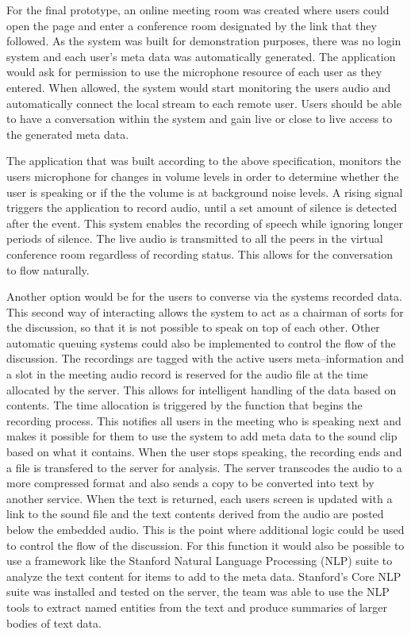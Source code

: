 \documentclass[english,12pt,a4paper,pdftex]{article}
\begin{document}
For the final prototype, an online meeting room was created where users could open the page and enter a conference room designated by the link that they followed. As the system was built for demonstration purposes, there was no login system and each user's meta data was automatically generated. The application would ask for permission to use the microphone resource of each user as they entered. When allowed, the system would start monitoring the users audio and automatically connect the local stream to each remote user. Users should be able to have a conversation within the system and gain live or close to live access to the generated meta data.

The application that was built according to the above specification, monitors the users microphone for changes in volume levels in order to determine whether the user is speaking or if the the volume is at background noise levels. A rising signal triggers the application to record audio, until a set amount of silence is detected after the event. This system enables the recording of speech while ignoring longer periods of silence. The live audio is transmitted to all the peers in the virtual conference room regardless of recording status. This allows for the conversation to flow naturally. 

Another option would be for the users to converse via the systems recorded data. This second way of interacting allows the system to act as a chairman of sorts for the discussion, so that it is not possible to speak on top of each other. Other automatic queuing systems could also be implemented to control the flow of the discussion. The recordings are tagged with the active users meta--information and a slot in the meeting audio record is reserved for the audio file at the time allocated by the server. This allows for intelligent handling of the data based on contents. The time allocation is triggered by the function that begins the recording process. This notifies all users in the meeting who is speaking next and makes it possible for them to use the system to add meta data to the sound clip based on what it contains. When the user stops speaking, the recording ends and a file is transfered to the server for analysis. The server transcodes the audio to a more compressed format and also sends a copy to be converted into text by another service. When the text is returned, each users screen is updated with a link to the sound file and the text contents derived from the audio are posted below the embedded audio. This is the point where additional logic could be used to control the flow of the discussion. For this function it would also be possible to use a framework like the Stanford Natural Language Processing (NLP) suite to analyze the text content for items to add to the meta data. Stanford's Core NLP suite was installed and tested on the server, the team was able to use the NLP tools to extract named entities from the text and produce summaries of larger bodies of text data.
\end{document}
